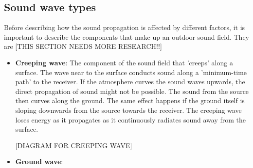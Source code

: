 \subsection{Sound wave types}
Before describing how the sound propagation is affected by different factors, it is important to describe the components that make up an outdoor sound field. They are [THIS SECTION NEEDS MORE RESEARCH!!]
\begin{itemize}
    \item \textbf{Creeping wave}: The component of the sound field that 'creeps' along a surface. The wave near to the surface conducts sound along a 'minimum-time path' to the receiver. If the atmosphere curves the sound waves upwards, the direct propagation of sound might not be possible. The sound from the source then curves along the ground. The same effect happens if the ground itself is sloping downwards from the source towards the receiver. The creeping wave loses energy as it propagates as it continuously radiates sound away from the surface. 
    
    [DIAGRAM FOR CREEPING WAVE]
    
    \item \textbf{Ground wave}: 
    
\end{itemize}


